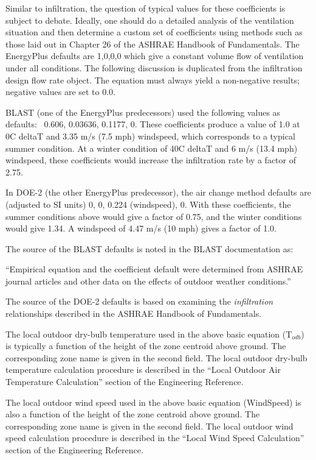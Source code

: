 Similar to infiltration, the question of typical values for these coefficients is subject to debate. Ideally, one should do a detailed analysis of the ventilation situation and then determine a custom set of coefficients using methods such as those laid out in Chapter 26 of the ASHRAE Handbook of Fundamentals. The EnergyPlus defaults are 1,0,0,0 which give a constant volume flow of ventilation under all conditions. The following discussion is duplicated from the infiltration design flow rate object. The equation must always yield a non-negative results; negative values are set to 0.0.

BLAST (one of the EnergyPlus predecessors) used the following values as defaults:~ 0.606, 0.03636, 0.1177, 0. These coefficients produce a value of 1.0 at 0C deltaT and 3.35 m/s (7.5 mph) windspeed, which corresponds to a typical summer condition. At a winter condition of 40C deltaT and 6 m/s (13.4 mph) windspeed, these coefficients would increase the infiltration rate by a factor of 2.75.

In DOE-2 (the other EnergyPlus predecessor), the air change method defaults are (adjusted to SI units) 0, 0, 0.224 (windspeed), 0. With these coefficients, the summer conditions above would give a factor of 0.75, and the winter conditions would give 1.34. A windspeed of 4.47 m/s (10 mph) gives a factor of 1.0.

The source of the BLAST defaults is noted in the BLAST documentation as:

``Empirical equation and the coefficient default were determined from ASHRAE journal articles and other data on the effects of outdoor weather conditions.''

The source of the DOE-2 defaults is based on examining the \emph{infiltration} relationships described in the ASHRAE Handbook of Fundamentals.

The local outdoor dry-bulb temperature used in the above basic equation (T\(_{odb}\)) is typically a function of the height of the zone centroid above ground. The corresponding zone name is given in the second field. The local outdoor dry-bulb temperature calculation procedure is described in the ``Local Outdoor Air Temperature Calculation'' section of the Engineering Reference.

The local outdoor wind speed used in the above basic equation (WindSpeed) is also a function of the height of the zone centroid above ground. The corresponding zone name is given in the second field. The local outdoor wind speed calculation procedure is described in the ``Local Wind Speed Calculation'' section of the Engineering Reference.

